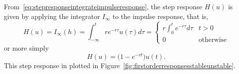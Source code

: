 \documentclass[11pt,a4paper]{book}
\theoremstyle{plain}
\numberwithin{equation}{section}
\begin{document}
From~\eqref{eq:stepresponseintegrateimpulseresponse}, the step response $H(u)$ is given by applying the integrator $I_\infty$ to the impulse response, that is, 
\[
H(u) = I_\infty(h) = \int_{-\infty}^t r e^{-r \tau} u(\tau) d\tau =  \begin{cases}
r \int_{0}^t e^{-r \tau} d\tau & t > 0 \\
0 & \text{otherwise} 
\end{cases}
\]
or more simply
\begin{equation}\label{eq:stepresponsefirstorder}
H(u) = \big( 1 - e^{-r t}\big) u(t).
\end{equation}
This step response in plotted in Figure~\ref{fig:firstorderresponsesstableunstable}.

\end{document}
